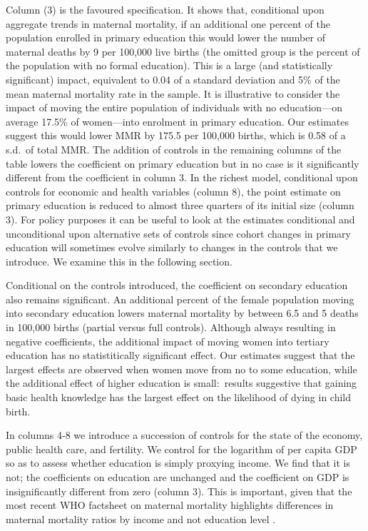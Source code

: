 \documentclass{article}[12pt,subeqn]
\begin{document}
\begin{spacing}{1.4}
Column (3) is the favoured specification. It shows that, conditional upon 
aggregate trends in maternal mortality, if an additional one percent of the 
population enrolled in primary education this would lower the number of maternal 
deaths by 9 per 100,000 live births (the omitted group is the percent of the
population with no formal education).  This is a large (and statistically
significant) impact, equivalent to 0.04 of a standard deviation and 5\% of the
mean maternal mortality rate in the sample. It is illustrative to consider the
impact of moving the entire population of individuals with no education---on
average 17.5\% of women---into enrolment in primary education. Our estimates
suggest this would lower MMR by 175.5 per 100,000 births, which is 0.58 of a
s.d.\ of total MMR. The addition of controls in the remaining columns of the
table lowers the coefficient on primary education but in no case is it
significantly different from the coefficient in column 3. In the richest model,
conditional upon controls for economic and health variables (column 8), the
point estimate on primary education is reduced to almost three quarters of its 
initial size (column 3). For policy purposes it can be useful to look at the 
estimates conditional and unconditional upon alternative sets of controls since 
cohort changes in primary education will sometimes evolve similarly to changes in 
the controls that we introduce. We examine this in the following section.

Conditional on the controls introduced, the coefficient on secondary education
also remains significant. An additional percent of the female population moving
into secondary education lowers maternal mortality by between 6.5 and 5 deaths
in 100,000 births (partial versus full controls).  Although always resulting
in negative coefficients, the additional impact of moving women into tertiary
education has no statistitically significant effect.  Our estimates suggest that
the largest effects are observed when women move from no to some education, while
the additional effect of higher education is small:\ results suggestive that
gaining basic health knowledge has the largest effect on the likelihood of dying
in child birth.

In columns 4-8 we introduce a succession of controls for the state of the
economy, public health care, and fertility. We control for the logarithm of per 
capita GDP so as to assess whether education is simply proxying income. We find 
that it is not; the coefficients on education are unchanged and the coefficient 
on GDP is insignificantly different from zero (column 3). This is important, 
given that the most recent WHO factsheet on maternal mortality highlights 
differences in maternal mortality ratios by income and not education level
\citep{WHO2012}.


\end{spacing}
\end{document}
